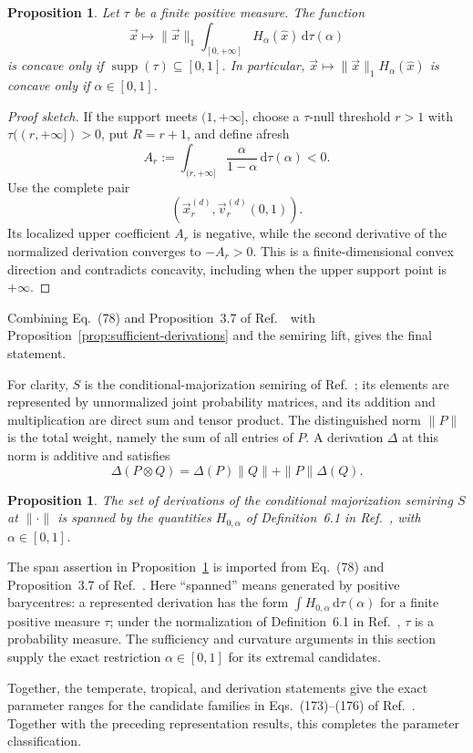 \documentclass[aps,pra,11pt,onecolumn,nofootinbib,tightenlines]{revtex4-2}
\newtheorem{proposition}[theorem]{Proposition}
\theoremstyle{definition}
\def\d{\mathrm{d}}
\newcommand{\ParameterMainDerivationRepresentation}{Eq.~(78) and Proposition~3.7 of Ref.~\cite{rubboli2026complete}}
\newcommand{\ParameterMainSemiring}{the conditional-majorization semiring of Ref.~\cite{rubboli2026complete}}
\newcommand{\ParameterMainNormalization}{the normalization of Definition~6.1 in Ref.~\cite{rubboli2026complete}}
\newcommand{\ParameterMainDerivationDefinition}{of Definition~6.1 in Ref.~\cite{rubboli2026complete}}
\newcommand{\ParameterMainFinalFamilies}{the candidate families in Eqs.~(173)--(176) of Ref.~\cite{rubboli2026complete}}
\newcommand{\ParameterSpanOrigin}{is imported from \ParameterMainDerivationRepresentation}
\begin{document}
\begin{proposition}
\label{prop:measure-derivation}
Let $\tau$ be a finite positive measure.  The function
\[
\vec{x}\longmapsto\|\vec{x}\|_1
\int_{[0,+\infty]}H_\alpha(\hat{x})\,\d\tau(\alpha)
\]
is concave only if
$\operatorname{supp}(\tau)\subseteq[0,1]$.  In particular,
$\vec{x}\mapsto\|\vec{x}\|_1H_\alpha(\hat{x})$ is concave only if
$\alpha\in[0,1]$.
\end{proposition}

\begin{proof}[Proof sketch]
If the support meets $(1,+\infty]$, choose a $\tau$-null threshold $r>1$ with
$\tau((r,+\infty])>0$, put $R=r+1$, and define afresh
\[
A_r:=\int_{(r,+\infty]}
\frac{\alpha}{1-\alpha}\,\d\tau(\alpha)<0.
\]
Use the complete pair
\begin{equation}
\left(
\vec{x}_r^{(d)},
\vec{v}_r^{(d)}(0,1)
\right).
\label{eq:derivation-upper-witness-pair}
\end{equation}
Its localized upper
coefficient $A_r$ is negative, while the second derivative of the normalized
derivation converges to $-A_r>0$.  This is a finite-dimensional convex direction
and contradicts concavity, including when the upper support point is
$+\infty$.
\end{proof}

Combining \ParameterMainDerivationRepresentation\ with
Proposition~\ref{prop:sufficient-derivations} and the semiring lift, gives the
final statement.

For clarity, $S$ is \ParameterMainSemiring; its elements are represented by
unnormalized joint probability matrices, and its addition
and multiplication are direct sum and tensor product.  The distinguished norm
$\|P\|$ is the total weight, namely the sum of all entries of $P$.  A
derivation $\Delta$ at this norm is additive and satisfies
\[
\Delta(P\otimes Q)
=\Delta(P)\|Q\|+\|P\|\Delta(Q).
\]

\begin{proposition}
\label{prop:Derivations}
The set of derivations of the conditional majorization semiring $S$ at
$\|\cdot\|$ is spanned by the quantities $H_{0,\alpha}$
\ParameterMainDerivationDefinition, with $\alpha\in[0,1]$.
\end{proposition}

The span assertion in Proposition~\ref{prop:Derivations} \ParameterSpanOrigin.
Here ``spanned'' means generated by positive
barycentres: a represented derivation has the form
$\int H_{0,\alpha}\,\d\tau(\alpha)$ for a finite positive measure $\tau$;
under \ParameterMainNormalization, $\tau$ is a probability measure.
The sufficiency and curvature arguments in this section supply the exact
restriction $\alpha\in[0,1]$ for its extremal candidates.

Together, the temperate, tropical, and derivation statements give the exact
parameter ranges for \ParameterMainFinalFamilies.  Together with the preceding
representation results, this completes the parameter classification.

\ifdefined\IntegratedParameterSections
\else


\end{document}
